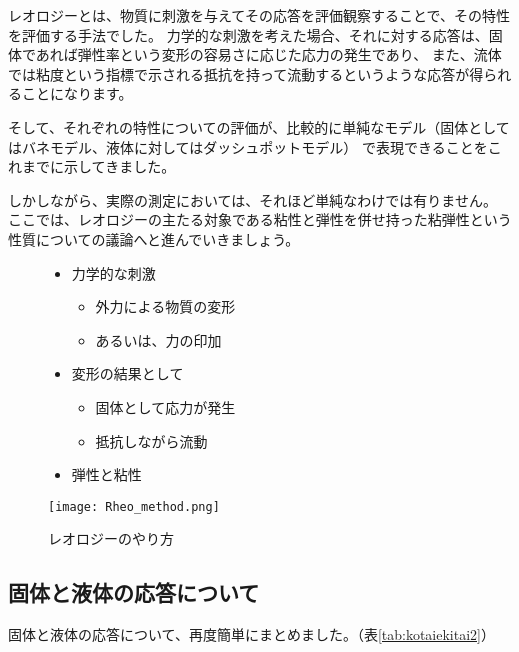\documentclass[uplatex,dvipdfmx,a4paper,11pt]{jsreport}
\begin{document}
レオロジーとは、物質に刺激を与えてその応答を評価観察することで、その特性を評価する手法でした。
力学的な刺激を考えた場合、それに対する応答は、固体であれば弾性率という変形の容易さに応じた応力の発生であり、
また、流体では粘度という指標で示される抵抗を持って流動するというような応答が得られることになります。

そして、それぞれの特性についての評価が、比較的に単純なモデル（固体としてはバネモデル、液体に対してはダッシュポットモデル）
で表現できることをこれまでに示してきました。

しかしながら、実際の測定においては、それほど単純なわけでは有りません。
ここでは、レオロジーの主たる対象である粘性と弾性を併せ持った粘弾性という性質についての議論へと進んでいきましょう。
\begin{figure}[htb]
	\begin{center}
		\begin{minipage}{0.4\textwidth}
			\begin{itemize}
				\item 力学的な刺激
				\begin{itemize}
					\item 外力による物質の変形
					\item あるいは、力の印加
				\end{itemize}
				\item 変形の結果として
				\begin{itemize}
					\item 固体として応力が発生
					\item 抵抗しながら流動
				\end{itemize}
				\item 弾性と粘性
			\end{itemize}
		\end{minipage}
		\begin{minipage}{0.5\textwidth}
			\begin{center}
			\texttt{[image: Rheo\_method.png]}
			\end{center}
		\end{minipage}
		\caption{レオロジーのやり方}
	\end{center}
\end{figure}

\subsection{固体と液体の応答について}

固体と液体の応答について、再度簡単にまとめました。（表\ref{tab:kotaiekitai2}）
\end{document}
